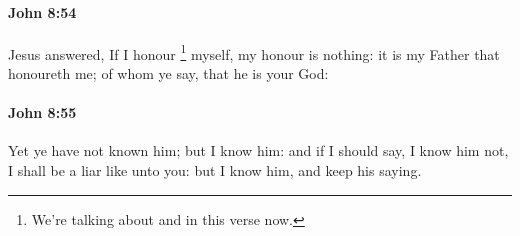 		\paragraph{John 8:54} %
			\label{JOHN-8-54}

			Jesus answered, If I honour%
				\footnote{%
					We're talking about  and  in this verse now.
					}
			myself, my honour is nothing: it is my Father that honoureth me; of whom ye say, that he is your God:

			\begin{framed}
				\scriptsize
				\begin{compactdesc}
					\item[SBLG] 
				\end{compactdesc}
			\end{framed}

		\paragraph{John 8:55} %
			\label{JOHN-8-55}

			Yet ye have not known him; but I know him: and if I should say, I know him not, I shall be a liar like unto you: but I know him, and keep his saying.

